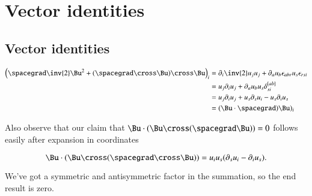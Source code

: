 \label{chap:appendix:constantSpinSurfaces}
\chapter{Vector identities}
\section{Vector identities}

\begin{equation}\label{eqn:constantSpinSurfaces:170}
\begin{aligned}
\left( \spacegrad \inv{2} \Bu^2 + (\spacegrad \cross \Bu) \cross \Bu \right)_i
&=
\partial_i \inv{2} u_j u_j + \partial_a u_b \epsilon_{a b r} u_s \epsilon_{r s i} \\
&=
u_j \partial_i u_j + \partial_a u_b u_s \delta^{[a b]}_{s i} \\
&=
u_j \partial_i u_j 
+ u_s \partial_s u_i 
- u_s \partial_i u_s \\
&= (\Bu \cdot \spacegrad) \Bu)_i 
\end{aligned}
\end{equation}

Also observe that our claim that $\Bu \cdot (\Bu \cross (\spacegrad \Bu)) = 0$ follows easily after expansion in coordinates

\begin{equation}\label{eqn:constantSpinSurfaces:190}
\Bu \cdot (\Bu \cross (\spacegrad \cross \Bu) )
=
u_i u_s ( \partial_s u_i - \partial_i u_s ).
\end{equation}

We've got a symmetric and antisymmetric factor in the summation, so the end result is zero.



